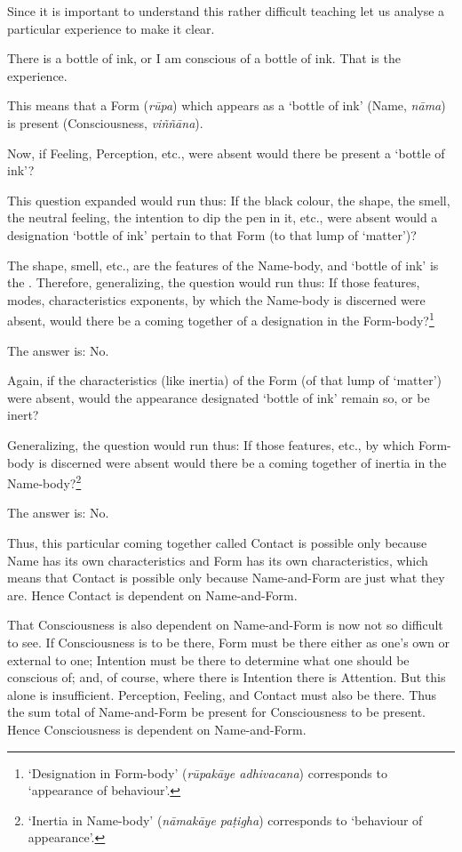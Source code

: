Since it is important to understand this rather difficult teaching let us analyse a particular experience to make it clear.

There is a bottle of ink, or I am conscious of a bottle of ink. That is the experience.

This means that a Form (\emph{rūpa}) which appears as a `bottle of ink' (Name, \emph{nāma}) is present (Consciousness, \emph{viññāna}).

Now, if Feeling, Perception, etc., were absent would there be present a `bottle of ink'?

This question expanded would run thus: If the black colour, the shape, the smell, the neutral feeling, the intention to dip the pen in it, etc., were absent would a designation `bottle of ink' pertain to that Form (to that lump of `matter')?

The shape, smell, etc., are the features of the Name-body, and `bottle of ink' is the . Therefore, generalizing, the question would run thus: If those features, modes, characteristics exponents, by which the Name-body is discerned were absent, would there be a coming together of a designation in the Form-body?\footnote{`Designation in Form-body' (\emph{rūpakāye adhivacana}) corresponds to `appearance of behaviour'.}

The answer is: No.

Again, if the characteristics (like inertia) of the Form (of that lump of `matter') were absent, would the appearance designated `bottle of ink' remain so, or be inert?

Generalizing, the question would run thus: If those features, etc., by which Form-body is discerned were absent would there be a coming together of inertia in the Name-body?\footnote{`Inertia in Name-body' (\emph{nāmakāye paṭigha}) corresponds to `behaviour of appearance'.}

The answer is: No.

Thus, this particular coming together called Contact is possible only because Name has its own characteristics and Form has its own characteristics, which means that Contact is possible only because Name-and-Form are just what they are. Hence Contact is dependent on Name-and-Form.

That Consciousness is also dependent on Name-and-Form is now not so difficult to see. If Consciousness is to be there, Form must be there either as one's own or external to one; Intention must be there to determine what one should be conscious of; and, of course, where there is Intention there is Attention. But this alone is insufficient. Perception, Feeling, and Contact must also be there. Thus the sum total of Name-and-Form  be present for Consciousness to be present. Hence Consciousness is dependent on Name-and-Form.

